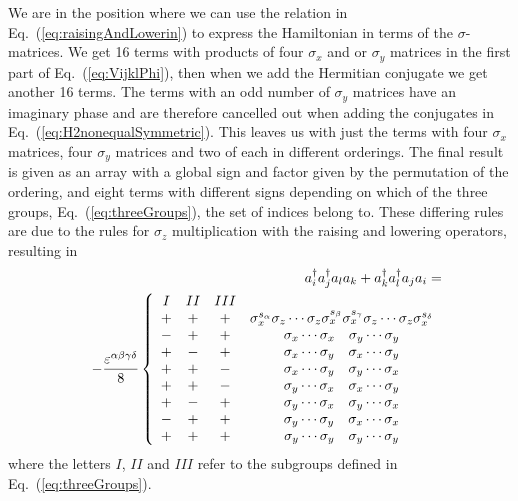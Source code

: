 We are in the position where we can use the relation in 
Eq.~(\ref{eq:raisingAndLowerin}) to express
the Hamiltonian in terms of the $\sigma$-matrices.  
We get 16 terms with products of four
$\sigma_x$ and or $\sigma_y$ matrices in the first part of
Eq.~(\ref{eq:VijklPhi}),
then when we add the Hermitian conjugate we get another 16 terms.
The terms with an odd number of $\sigma_y$ matrices have an imaginary
phase and are therefore cancelled out
when adding the conjugates in Eq.~(\ref{eq:H2nonequalSymmetric}).
This leaves us with just the terms with four $\sigma_x$
matrices, four $\sigma_y$ matrices and two of each in different
orderings. 
The final result is given as an array with a global sign and factor
given by the permutation of the ordering, and eight terms with
different signs depending on which of the three groups,
Eq.~(\ref{eq:threeGroups}), the set of indices belong to.
These differing rules are due to the rules for $\sigma_z$
multiplication with the raising and lowering operators,  resulting  in 
\begin{eqnarray}
\label{eq:Phiijkl}
&&a^\dag_i a^\dag_j a_l a_k + a_k^\dag a_l^\dag a_j a_i= \notag \\
&&-\frac{\varepsilon^{\alpha\beta\gamma\delta}}{8} \left\{
\begin{array}{cccc}
I & II & III &  \\
+& + & + & \sigma_x^{s_\alpha} \sigma_z \cdots \sigma_z 
\sigma_x^{s_\beta} \sigma_x^{s_\gamma}\sigma_z\cdots \sigma_z
\sigma_x^{s_\delta}\\
-& +& +& \sigma_x \cdots \sigma_x \quad \sigma_y \cdots\sigma_y \\
+& -& +& \sigma_x \cdots \sigma_y \quad \sigma_x \cdots\sigma_y \\
+& +& -& \sigma_x \cdots \sigma_y \quad \sigma_y \cdots\sigma_x \\
+& +& -& \sigma_y \cdots \sigma_x \quad \sigma_x \cdots\sigma_y \\
+& -& +& \sigma_y \cdots \sigma_x \quad \sigma_y \cdots\sigma_x \\
-& +& +& \sigma_y \cdots \sigma_y \quad \sigma_x \cdots\sigma_x \\
+& +& +& \sigma_y \cdots \sigma_y \quad \sigma_y \cdots\sigma_y \\
\end{array} 
\right.
\end{eqnarray}
where the letters $I$, $II$ and $III$ refer to the subgroups defined
in Eq.~(\ref{eq:threeGroups}). 


